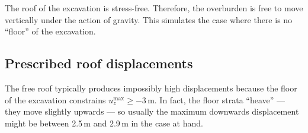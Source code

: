 \documentclass[]{scrreprt}
\begin{document}
The roof of the excavation is stress-free.  Therefore, the
overburden is free to move vertically under the action of gravity.
This simulates the case where there is no ``floor'' of the excavation.

\subsection{Prescribed roof displacements}
\label{prescribed.roof.defn.sec}

The free roof typically produces impossibly high displacements
because the floor of the excavation constrains
$u_{z}^{\mathrm{max}}\geq -3$\,m.  In fact, the floor strata ``heave''
--- they move slightly upwards --- so usually the maximum downwards
displacement might be between 2.5\,m and 2.9\,m in the case at hand.
\end{document}
